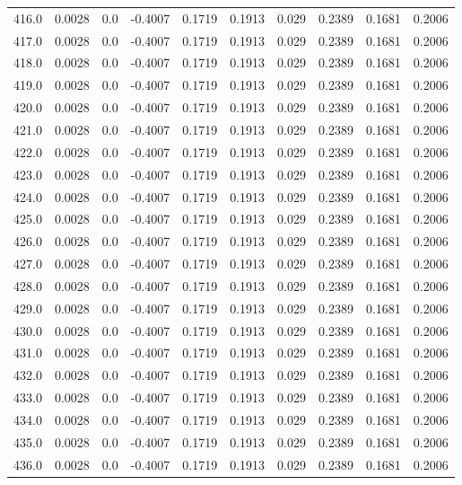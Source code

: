 \begin{longtable}{lrrrrrrrrr}
416.0 & 0.0028 & 0.0 & -0.4007 & 0.1719 & 0.1913 & 0.029 & 0.2389 & 0.1681 & 0.2006 \\
417.0 & 0.0028 & 0.0 & -0.4007 & 0.1719 & 0.1913 & 0.029 & 0.2389 & 0.1681 & 0.2006 \\
418.0 & 0.0028 & 0.0 & -0.4007 & 0.1719 & 0.1913 & 0.029 & 0.2389 & 0.1681 & 0.2006 \\
419.0 & 0.0028 & 0.0 & -0.4007 & 0.1719 & 0.1913 & 0.029 & 0.2389 & 0.1681 & 0.2006 \\
420.0 & 0.0028 & 0.0 & -0.4007 & 0.1719 & 0.1913 & 0.029 & 0.2389 & 0.1681 & 0.2006 \\
421.0 & 0.0028 & 0.0 & -0.4007 & 0.1719 & 0.1913 & 0.029 & 0.2389 & 0.1681 & 0.2006 \\
422.0 & 0.0028 & 0.0 & -0.4007 & 0.1719 & 0.1913 & 0.029 & 0.2389 & 0.1681 & 0.2006 \\
423.0 & 0.0028 & 0.0 & -0.4007 & 0.1719 & 0.1913 & 0.029 & 0.2389 & 0.1681 & 0.2006 \\
424.0 & 0.0028 & 0.0 & -0.4007 & 0.1719 & 0.1913 & 0.029 & 0.2389 & 0.1681 & 0.2006 \\
425.0 & 0.0028 & 0.0 & -0.4007 & 0.1719 & 0.1913 & 0.029 & 0.2389 & 0.1681 & 0.2006 \\
426.0 & 0.0028 & 0.0 & -0.4007 & 0.1719 & 0.1913 & 0.029 & 0.2389 & 0.1681 & 0.2006 \\
427.0 & 0.0028 & 0.0 & -0.4007 & 0.1719 & 0.1913 & 0.029 & 0.2389 & 0.1681 & 0.2006 \\
428.0 & 0.0028 & 0.0 & -0.4007 & 0.1719 & 0.1913 & 0.029 & 0.2389 & 0.1681 & 0.2006 \\
429.0 & 0.0028 & 0.0 & -0.4007 & 0.1719 & 0.1913 & 0.029 & 0.2389 & 0.1681 & 0.2006 \\
430.0 & 0.0028 & 0.0 & -0.4007 & 0.1719 & 0.1913 & 0.029 & 0.2389 & 0.1681 & 0.2006 \\
431.0 & 0.0028 & 0.0 & -0.4007 & 0.1719 & 0.1913 & 0.029 & 0.2389 & 0.1681 & 0.2006 \\
432.0 & 0.0028 & 0.0 & -0.4007 & 0.1719 & 0.1913 & 0.029 & 0.2389 & 0.1681 & 0.2006 \\
433.0 & 0.0028 & 0.0 & -0.4007 & 0.1719 & 0.1913 & 0.029 & 0.2389 & 0.1681 & 0.2006 \\
434.0 & 0.0028 & 0.0 & -0.4007 & 0.1719 & 0.1913 & 0.029 & 0.2389 & 0.1681 & 0.2006 \\
435.0 & 0.0028 & 0.0 & -0.4007 & 0.1719 & 0.1913 & 0.029 & 0.2389 & 0.1681 & 0.2006 \\
436.0 & 0.0028 & 0.0 & -0.4007 & 0.1719 & 0.1913 & 0.029 & 0.2389 & 0.1681 & 0.2006 \\

\end{longtable}
